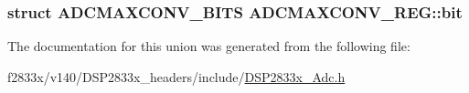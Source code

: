 \subsubsection[{bit}]{\setlength{\rightskip}{0pt plus 5cm}struct {\bf A\+D\+C\+M\+A\+X\+C\+O\+N\+V\+\_\+\+B\+I\+T\+S} A\+D\+C\+M\+A\+X\+C\+O\+N\+V\+\_\+\+R\+E\+G\+::bit}\label{union_a_d_c_m_a_x_c_o_n_v___r_e_g_ad4708982d234215d010c18a0123bb0c1}


The documentation for this union was generated from the following file\+:\begin{DoxyCompactItemize}
\item 
f2833x/v140/\+D\+S\+P2833x\+\_\+headers/include/\hyperlink{_d_s_p2833x___adc_8h}{D\+S\+P2833x\+\_\+\+Adc.\+h}\end{DoxyCompactItemize}

